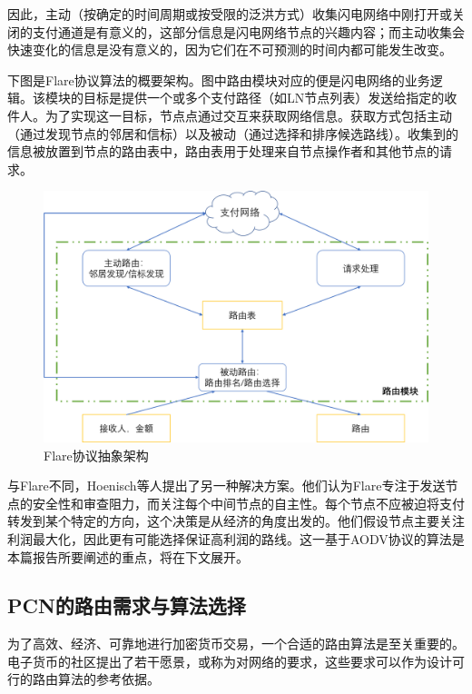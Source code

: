 \documentclass[12pt,a4paper]{article}
\begin{document}
因此，主动（按确定的时间周期或按受限的泛洪方式）收集闪电网络中刚打开或关闭的支付通道是有意义的，这部分信息是闪电网络节点的兴趣内容；而主动收集会快速变化的信息是没有意义的，因为它们在不可预测的时间内都可能发生改变。

下图是Flare协议算法的概要架构。图中路由模块对应的便是闪电网络的业务逻辑。该模块的目标是提供一个或多个支付路径（如LN节点列表）发送给指定的收件人。为了实现这一目标，节点点通过交互来获取网络信息。获取方式包括主动（通过发现节点的邻居和信标）以及被动（通过选择和排序候选路线）。收集到的信息被放置到节点的路由表中，路由表用于处理来自节点操作者和其他节点的请求。

\begin{figure}[htb]
\centering
\includegraphics[width=12cm]{high_level_flare}
\caption{Flare协议抽象架构}
\end{figure}

与Flare不同，Hoenisch等人提出了另一种解决方案\cite{hoenisch2018aodv}。他们认为Flare专注于发送节点的安全性和审查阻力，而\cite{hoenisch2018aodv}关注每个中间节点的自主性。每个节点不应被迫将支付转发到某个特定的方向，这个决策是从经济的角度出发的。他们假设节点主要关注利润最大化，因此更有可能选择保证高利润的路线。这一基于AODV协议的算法是本篇报告所要阐述的重点，将在下文展开。

\subsection{PCN的路由需求与算法选择}
为了高效、经济、可靠地进行加密货币交易，一个合适的路由算法是至关重要的。电子货币的社区提出了若干愿景\cite{beliefs}，或称为对网络的要求，这些要求可以作为设计可行的路由算法的参考依据。
\end{document}
